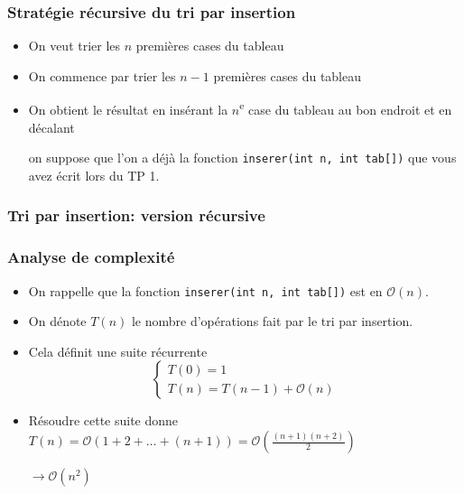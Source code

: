 \documentclass[aspectratio=169]{beamer}
\begin{document}
\begin{frame}
  \frametitle{Stratégie récursive du tri par insertion}
  \begin{itemize}
  \item On veut trier les \(n\) premières cases du tableau
  \item On commence par trier les \(n-1\) premières cases du tableau
  \item On obtient le résultat en insérant la \(n\)\textsuperscript{e} case du
    tableau au bon endroit et en décalant

    \alert{on suppose que l'on a déjà la fonction
      \lstinline|inserer(int n, int tab[])| que vous avez écrit lors du TP 1.}
  \end{itemize}

\end{frame}

\begin{frame}
  \frametitle{Tri par insertion: version récursive}


\end{frame}

\begin{frame}
  \frametitle{Analyse de complexité}

  \begin{itemize}
  \item On rappelle que la fonction \lstinline|inserer(int n, int tab[])| est en
    \(\mathcal{O} (n)\).
  \item On dénote \(T(n)\) le nombre d'opérations fait par le tri par insertion.
  \item Cela définit une suite récurrente
    \[
      \begin{cases}
        T(0) = 1 \\
        T(n) = T(n-1) + \mathcal{O}(n)
      \end{cases}
    \]
  \item Résoudre cette suite donne \(T(n) = \mathcal{O}(1+2+\ldots +(n+1)) =
    \mathcal{O}(\frac{(n+1)(n+2)}{2})\)

    \alert{\(\to \mathcal{O}(n^{2})\)}
  \end{itemize}

\end{frame}
\end{document}
